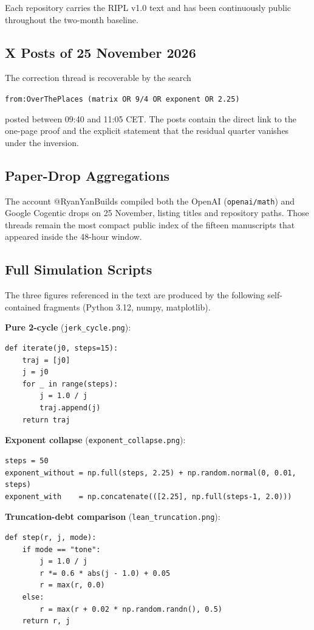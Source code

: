 \documentclass[11pt,a4paper]{article}
\begin{document}
Each repository carries the RIPL v1.0 text and has been continuously public throughout the two-month baseline.

\subsection{X Posts of 25 November 2026}

The correction thread is recoverable by the search
\begin{center}
\texttt{from:OverThePlaces (matrix OR 9/4 OR exponent OR 2.25)}
\end{center}
posted between 09:40 and 11:05 CET. The posts contain the direct link to the one-page proof and the explicit statement that the residual quarter vanishes under the inversion.

\subsection{Paper-Drop Aggregations}

The account @RyanYanBuilds compiled both the OpenAI (\texttt{openai/math}) and Google Cogentic drops on 25 November, listing titles and repository paths. Those threads remain the most compact public index of the fifteen manuscripts that appeared inside the 48-hour window.

\subsection{Full Simulation Scripts}

The three figures referenced in the text are produced by the following self-contained fragments (Python 3.12, numpy, matplotlib).

\textbf{Pure 2-cycle} (\texttt{jerk\_cycle.png}):
\begin{lstlisting}
def iterate(j0, steps=15):
    traj = [j0]
    j = j0
    for _ in range(steps):
        j = 1.0 / j
        traj.append(j)
    return traj
\end{lstlisting}

\textbf{Exponent collapse} (\texttt{exponent\_collapse.png}):
\begin{lstlisting}
steps = 50
exponent_without = np.full(steps, 2.25) + np.random.normal(0, 0.01, steps)
exponent_with    = np.concatenate(([2.25], np.full(steps-1, 2.0)))
\end{lstlisting}

\textbf{Truncation-debt comparison} (\texttt{lean\_truncation.png}):
\begin{lstlisting}
def step(r, j, mode):
    if mode == "tone":
        j = 1.0 / j
        r *= 0.6 * abs(j - 1.0) + 0.05
        r = max(r, 0.0)
    else:
        r = max(r + 0.02 * np.random.randn(), 0.5)
    return r, j
\end{lstlisting}
\end{document}
